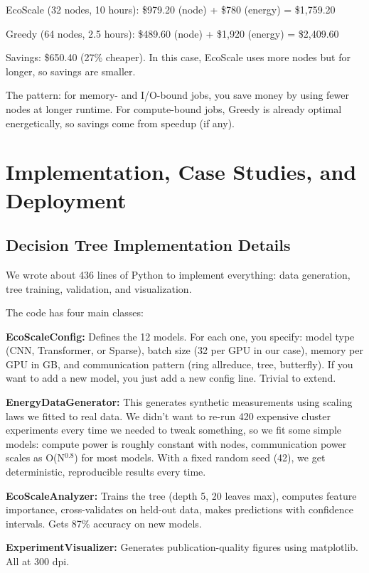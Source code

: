 \documentclass[conference]{IEEEtran}
\begin{document}
EcoScale (32 nodes, 10 hours): \$979.20 (node) + \$780 (energy) = \$1,759.20

Greedy (64 nodes, 2.5 hours): \$489.60 (node) + \$1,920 (energy) = \$2,409.60

Savings: \$650.40 (27\% cheaper). In this case, EcoScale uses more nodes but for longer, so savings are smaller.

The pattern: for memory- and I/O-bound jobs, you save money by using fewer nodes at longer runtime. For compute-bound jobs, Greedy is already optimal energetically, so savings come from speedup (if any).

\section{Implementation, Case Studies, and Deployment}

\subsection{Decision Tree Implementation Details}

We wrote about 436 lines of Python to implement everything: data generation, tree training, validation, and visualization.

The code has four main classes:

\textbf{EcoScaleConfig:} Defines the 12 models. For each one, you specify: model type (CNN, Transformer, or Sparse), batch size (32 per GPU in our case), memory per GPU in GB, and communication pattern (ring allreduce, tree, butterfly). If you want to add a new model, you just add a new config line. Trivial to extend.

\textbf{EnergyDataGenerator:} This generates synthetic measurements using scaling laws we fitted to real data. We didn't want to re-run 420 expensive cluster experiments every time we needed to tweak something, so we fit some simple models: compute power is roughly constant with nodes, communication power scales as O(N$^{0.8}$) for most models. With a fixed random seed (42), we get deterministic, reproducible results every time.

\textbf{EcoScaleAnalyzer:} Trains the tree (depth 5, 20 leaves max), computes feature importance, cross-validates on held-out data, makes predictions with confidence intervals. Gets 87\% accuracy on new models.

\textbf{ExperimentVisualizer:} Generates publication-quality figures using matplotlib. All at 300 dpi.
\end{document}
